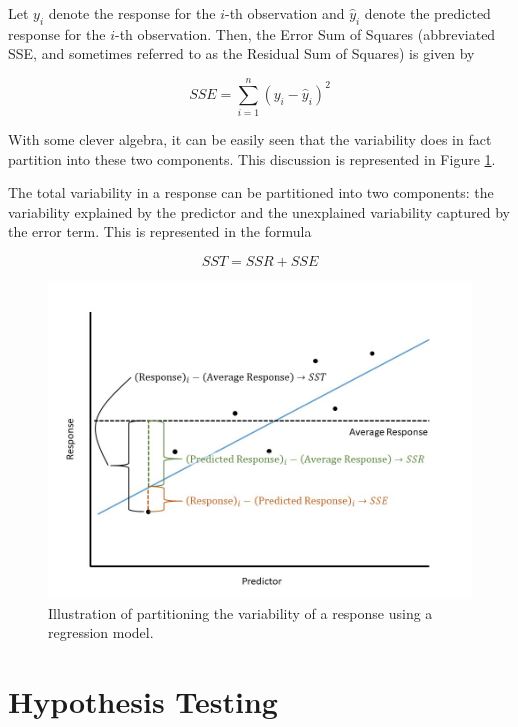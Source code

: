 \documentclass[]{book}
\theoremstyle{plain}
\theoremstyle{mydefn}
\theoremstyle{myexmpl}
\theoremstyle{remark}
\let\BeginKnitrBlock\begin \let\EndKnitrBlock\end
\let\BeginKnitrBlock\begin \let\EndKnitrBlock\end
\begin{document}
\BeginKnitrBlock{definition}[Error Sum of Squares]
\protect\hypertarget{def:defn-sse}{}{\label{def:defn-sse} {} }Let \(y_i\) denote the response for the \(i\)-th
observation and \(\widehat{y}_i\) denote the predicted response for the
\(i\)-th observation. Then, the Error Sum of Squares (abbreviated SSE,
and sometimes referred to as the Residual Sum of Squares) is given by

\[SSE = \sum_{i=1}^{n} \left(y_i - \widehat{y}_i\right)^2\]
\EndKnitrBlock{definition}

With some clever algebra, it can be easily seen that the variability
does in fact partition into these two components. This discussion is
represented in Figure \ref{fig:regquality-partition-variability}.

\BeginKnitrBlock{rmdkeyidea}
The total variability in a response can be partitioned into two
components: the variability explained by the predictor and the
unexplained variability captured by the error term. This is represented
in the formula

\[SST = SSR + SSE\]
\EndKnitrBlock{rmdkeyidea}

\begin{figure}

{\centering \includegraphics[width=0.8\linewidth]{./images/RegQuality-Partitioning-Variability} 

}

\caption{Illustration of partitioning the variability of a response using a regression model.}\label{fig:regquality-partition-variability}
\end{figure}

\section{Hypothesis Testing}\label{hypothesis-testing}
\end{document}
